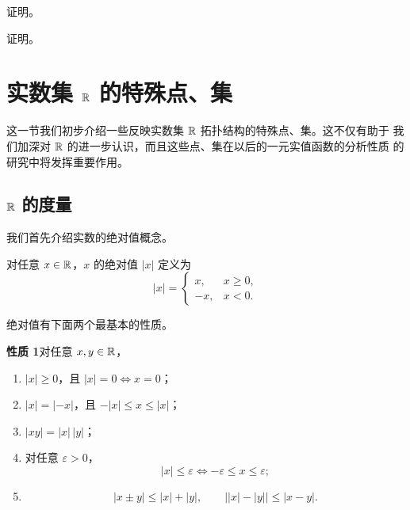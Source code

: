 \begin{exercise}
  \item 证明。
\end{exercise}

\begin{exercise}
  \item 证明。
\end{exercise}

\section{实数集 \(\mathbb{R}\) 的特殊点、集}

这一节我们初步介绍一些反映实数集 \(\mathbb{R}\) 拓扑结构的特殊点、集。这不仅有助于
我们加深对 \(\mathbb{R}\) 的进一步认识，而且这些点、集在以后的一元实值函数的分析性质
的研究中将发挥重要作用。

\subsection{\(\mathbb{R}\) 的度量}
	\label{sec:2-5-1}

我们首先介绍实数的绝对值概念。

\begin{mydef*}{}
对任意 \(x\in\mathbb{R}\)，\(x\) 的绝对值 \(|x|\) 定义为
\[
|x|=\begin{cases}
x,&x\geq0,\\
-x,&x<0.
\end{cases}
\]
\end{mydef*}

绝对值有下面两个最基本的性质。

\textbf{性质 1}\quad 对任意 \(x,y\in\mathbb{R}\)，
\begin{enumerate}[label=\arabic*)]
  \item \(|x|\geq0\)，且 \(|x|=0\iff x=0\)；
  \item \(|x|=|-x|\)，且 \(-|x|\leq x\leq|x|\)；
  \item \(|xy|=|x|\,|y|\)；
  \item 对任意 \(\varepsilon>0\)，
  \[
  |x|\leq\varepsilon\iff-\varepsilon\leq x\leq\varepsilon;
  \]
  \item
  \[
  |x\pm y|\leq|x|+|y|,
  \qquad
  \bigl||x|-|y|\bigr|\leq|x-y|.
  \]
\end{enumerate}

